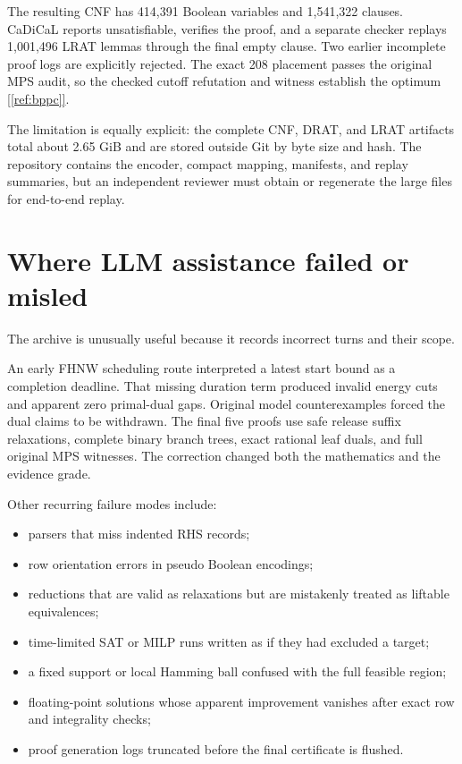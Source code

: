 \documentclass[11pt,letterpaper]{article}
\newcommand{\sourcecite}[1]{\hyperref[#1]{[\ref*{#1}]}}
\begin{document}
The resulting CNF has 414,391 Boolean variables and 1,541,322 clauses. CaDiCaL reports unsatisfiable, \texttt{} verifies the proof, and a separate checker replays 1,001,496 LRAT lemmas through the final empty clause. Two earlier incomplete proof logs are explicitly rejected. The exact 208 placement passes the original MPS audit, so the checked cutoff refutation and witness establish the optimum \sourcecite{ref:bppc}.

The limitation is equally explicit: the complete CNF, DRAT, and LRAT artifacts total about 2.65 GiB and are stored outside Git by byte size and hash. The repository contains the encoder, compact mapping, manifests, and replay summaries, but an independent reviewer must obtain or regenerate the large files for end-to-end replay.

\section{Where LLM assistance failed or misled}

The archive is unusually useful because it records incorrect turns and their scope.

An early FHNW scheduling route interpreted a latest start bound as a completion deadline. That missing duration term produced invalid energy cuts and apparent zero primal-dual gaps. Original model counterexamples forced the dual claims to be withdrawn. The final five proofs use safe release suffix relaxations, complete binary branch trees, exact rational leaf duals, and full original MPS witnesses. The correction changed both the mathematics and the evidence grade.

Other recurring failure modes include:

\begin{itemize}
\item parsers that miss indented RHS records;
\item row orientation errors in pseudo Boolean encodings;
\item reductions that are valid as relaxations but are mistakenly treated as liftable equivalences;
\item time-limited SAT or MILP runs written as if they had excluded a target;
\item a fixed support or local Hamming ball confused with the full feasible region;
\item floating-point solutions whose apparent improvement vanishes after exact row and integrality checks;
\item proof generation logs truncated before the final certificate is flushed.
\end{itemize}
\end{document}
